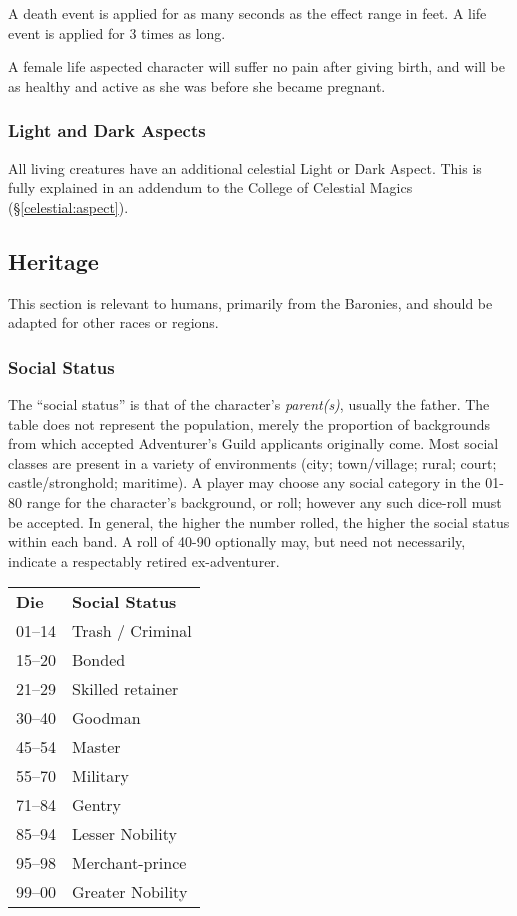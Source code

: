 \begin{multicols*}{3}
A death event is applied for as many seconds as the effect range in
feet. A life event is applied for 3 times as long.

A female life aspected character will suffer no pain after giving
birth, and will be as healthy and active as she was before she became
pregnant.

\subsubsection{Light and Dark Aspects}

All living creatures have an additional celestial Light or Dark
Aspect.  This is fully explained in an addendum to the College of
Celestial Magics (\S\ref{celestial:aspect}).

\subsection{Heritage}
\label{chargen:heritage}

This section is relevant to humans, primarily from the Baronies, and
should be adapted for other races or regions.

\subsubsection{Social Status}

The ``social status'' is that of the character's \emph{parent(s)},
usually the father.  The table does not represent the population,
merely the proportion of backgrounds from which accepted Adventurer's
Guild applicants originally come. Most social classes are present in a
variety of environments (city; town/village; rural; court;
castle/stronghold; maritime).  A player may choose any social category
in the 01-80 range for the character's background, or roll; however
any such dice-roll must be accepted.  In general, the higher the
number rolled, the higher the social status within each band.  A roll
of 40-90 optionally may, but need not necessarily, indicate a
respectably retired ex-adventurer.


\begin{tabularx}{\linewidth}{lX}
\textbf{Die} & \textbf{Social Status} \\
01--14	& Trash / Criminal \\
15--20	& Bonded \\
21--29	& Skilled retainer\\
30--40	& Goodman \\
45--54	& Master \\
55--70	& Military \\
71--84	& Gentry \\
85--94	& Lesser Nobility \\
95--98	& Merchant-prince \\
99--00	& Greater Nobility \\
\end{tabularx}


\end{multicols*}
